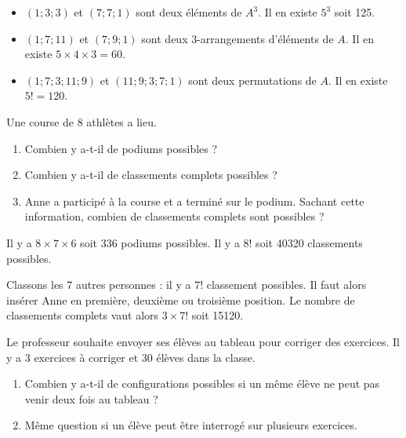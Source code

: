 \documentclass[11pt,fleqn, openany]{book} %
\begin{document}
\begin{solution}\hspace{0pt}
\vspace{-0.5cm}
\begin{itemize}
\item $(1;3;3)$ et $(7;7;1)$ sont deux éléments de $A^3$. Il en existe $5^3$ soit 125.
\item $(1;7;11)$ et $(7;9;1)$ sont deux 3-arrangements d'éléments de $A$. Il en existe $5 \times 4 \times 3 = 60$.
\item $(1;7;3;11;9)$ et $(11;9;3;7;1)$ sont deux permutations de $A$. Il en existe $5!=120$.
\end{itemize}\end{solution}



\begin{exercise}Une course de 8 athlètes a lieu. 
\begin{enumerate}
\item Combien y a-t-il de podiums possibles ? 
\item Combien y a-t-il de classements complets possibles ?
\item Anne a participé à la course et a terminé sur le podium. Sachant cette information, combien de classements complets sont possibles ?
\end{enumerate}\newpage \end{exercise}

\begin{solution}Il y a $8 \times 7 \times 6$ soit 336 podiums possibles. Il y a $8!$ soit 40320 classements possibles.

Classons les 7 autres personnes : il y a 7! classement possibles. Il faut alors insérer Anne en première, deuxième ou troisième position. Le nombre de classements complets vaut alors $3 \times 7!$ soit 15120.\end{solution}




\begin{exercise}Le professeur souhaite envoyer ses élèves au tableau pour corriger des exercices. Il y a 3 exercices à corriger et 30 élèves dans la classe.
\begin{enumerate}
\item Combien y a-t-il de configurations possibles si un même élève ne peut pas venir deux fois au tableau ?
\item Même question si un élève peut être interrogé sur plusieurs exercices.
\end{enumerate}\end{exercise}
\end{document}
